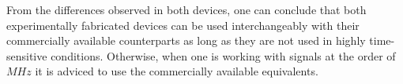 \documentclass[a4paper]{article}
\begin{document}
        From the differences observed in both devices, one can conclude that both experimentally fabricated devices can
        be used interchangeably with their commercially available counterparts as long as they are not used in highly time-sensitive
        conditions. Otherwise, when one is working with signals at the order of $MHz$ it is adviced to use the commercially available
        equivalents.
    
\end{document}
